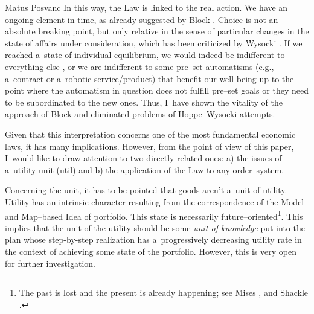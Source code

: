 \begin{artengenv}{Matus Posvanc}
In this way, the Law is linked to the real action. We have an ongoing element in time, as already suggested by Block 
\parencites*[][]{Block1980On}[][]{Block2009Rejoinder}. %
 Choice is not an absolute breaking point, but only relative in the sense of particular changes in the state of affairs under consideration, which has been criticized by Wysocki 
\parencite*[][]{Wysocki2021problem}. %
 If we reached a~state of individual equilibrium, we would indeed be indifferent to everything else 
\parencite[][]{Hoppe2005Must}, %
 or we are indifferent to some pre–set automatisms (e.g., a~contract or a~robotic service/product) that benefit our well-being up to the point where the automatism in question does not fulfill pre–set goals or they need to be subordinated to the new ones. Thus, I~have shown the vitality of the approach of Block 
\parencite*[][]{Block1980On} %
 and eliminated problems of Hoppe–Wysocki attempts.



Given that this interpretation concerns one of the most fundamental economic laws, it has many implications. However, from the point of view of this paper, I~would like to draw attention to two directly related ones: a) the issues of a~utility unit (util) and b) the application of the Law to any order–system.



Concerning the unit, it has to be pointed that goods aren't a~unit of utility. Utility has an intrinsic character resulting from the correspondence of the Model and Map–based Idea of portfolio. This state is necessarily future–oriented\footnote{The past is lost and the present is already happening; see Mises 
\parencite*[][]{Mises2014Theory}, %
 and Shackle 
\parencite*[][]{Shackle1992Epistemics}.%
}. This implies that the unit of the utility should be some \textit{unit of knowledge} put into the plan whose step-by-step realization has a~progressively decreasing utility rate in the context of achieving some state of the portfolio. However, this is very open for further investigation.




\end{artengenv}
